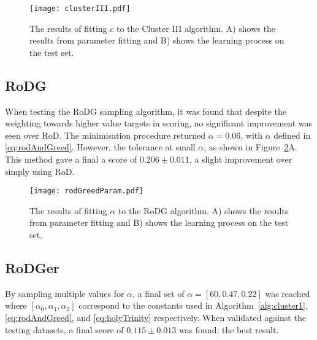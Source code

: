 \begin{figure}[H]
  \begin{center}
    \texttt{[image: clusterIII.pdf]}
    \caption[Cluster III]{The results of fitting $c$ to the Cluster III algorithm. A) shows the results from parameter fitting and B) shows the learning process on the test set.}
    \label{fig:clusterTest}
  \end{center}
\end{figure}

\subsection[Region of Disagreement with Greed]{RoDG}
When testing the RoDG sampling algorithm, it was found that despite the weighting towards higher value targets in scoring, no significant improvement was seen over RoD. The minimisation procedure returned ${\alpha{}=0.06}$, with $\alpha$ defined in \ref{eq:rodAndGreed}. However, the tolerance at small $\alpha$, as shown in Figure~\ref{fig:rogreed}A. This method gave a final a score of ${0.206\pm{}0.011}$, a slight improvement over simply using RoD.

\begin{figure}[H]
  \begin{center}
    \texttt{[image: rodGreedParam.pdf]}
    \caption[RoD with Greed]{The results of fitting $\alpha{}$ to the RoDG algorithm. A) shows the results from parameter fitting and B) shows the learning process on the test set.}
    \label{fig:rogreed}
  \end{center}
\end{figure}

\subsection[Region of Disagreement with Greed and Clusters]{RoDGer}
By sampling multiple values for $\alpha$, a final set of $\alpha=[60, 0.47, 0.22]$ was reached where $[\alpha{}_0, \alpha{}_1, \alpha{}_2]$ correspond to the constants used in Algorithm~\ref{alg:cluster1}, \ref{eq:rodAndGreed}, and \ref{eq:holyTrinity} respectively. When validated against the testing datasets, a final score of $0.115\pm{}0.013$ was found; the best result.

